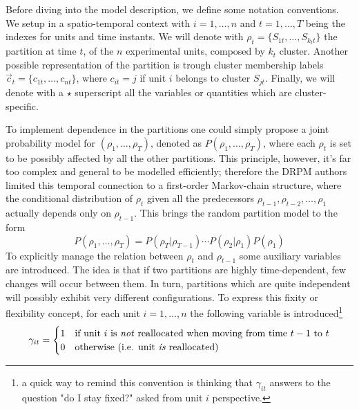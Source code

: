 \documentclass[12pt,	%
	a4paper,		%
	twoside,		%
	openright,		%
	titlepage,%
	]{book}
\theoremstyle{definition}
\begin{document}
Before diving into the model description, we define some notation conventions. We setup in a spatio-temporal context with $i=1,\ldots,n$ and $t=1,\ldots,T$ being the indexes for units and time instants. We will denote with $\rho_t=\{S_{1t}, \ldots, S_{k_tt}\}$ the partition at time $t$, of the $n$ experimental units, composed by $k_t$ cluster. Another possible representation of the partition is trough cluster membership labels $\vec{c}_t = \{ c_{1t}, \ldots, c_{nt}\}$, where $c_{it}=j$ if unit $i$ belongs to cluster $S_{jt}$. Finally, we will denote with a $\star$ superscript all the variables or quantities which are cluster-specific.

To implement dependence in the partitions one could simply propose a joint probability model for $(\rho_1, \ldots, \rho_T)$, denoted as $P(\rho_1, \ldots, \rho_T)$, where each $\rho_t$ is set to be possibly affected by all the other partitions. This principle, however, it's far too complex and general to be modelled efficiently; therefore the DRPM authors limited this temporal connection to a first-order Markov-chain structure, where the conditional distribution of $\rho_t$ given all the predecessors $\rho_{t-1}, \rho_{t-2}, \ldots, \rho_1$ actually depends only on $\rho_{t-1}$. This brings the random partition model to the form
\begin{equation}
P(\rho_1, \ldots, \rho_T) = P(\rho_T|\rho_{T-1}) \cdots P(\rho_2|\rho_1) P(\rho_1)
\end{equation}
To explicitly manage the relation between $\rho_t$ and $\rho_{t-1}$ some auxiliary variables are introduced. The idea is that if two partitions are highly time-dependent, few changes will occur between them. In turn, partitions which are quite independent will possibly exhibit very different configurations. To express this fixity or flexibility concept, for each unit $i=1,\ldots,n$ the following variable is introduced\footnote{a quick way to remind this convention is thinking that $\gamma_{it}$ answers to the question "do I stay fixed?" asked from unit $i$ perspective.}
\begin{equation}
\gamma_{it} = \begin{cases}
    1 & \text{if unit $i$ is \emph{not} reallocated when moving from time $t-1$ to $t$} \\
    0 & \text{otherwise (i.e. unit \emph{is} reallocated)}
\end{cases}
\end{equation}
\end{document}

